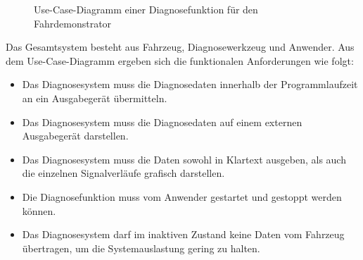 \begin{figure}[!htb]
	\centering
	\caption{Use-Case-Diagramm einer Diagnosefunktion für den Fahrdemonstrator}
	\label{abb:UseCaseDiagnose}
\end{figure}
	
Das Gesamtsystem besteht aus Fahrzeug, Diagnosewerkzeug und Anwender. Aus dem Use-Case-Diagramm ergeben sich die funktionalen Anforderungen wie folgt:

\begin{itemize}
	\item Das Diagnosesystem muss die Diagnosedaten innerhalb der Programmlaufzeit an ein Ausgabegerät übermitteln.
	\item Das Diagnosesystem muss die Diagnosedaten auf einem externen Ausgabegerät darstellen.
	\item Das Diagnosesystem muss die Daten sowohl in Klartext ausgeben, als auch die einzelnen Signalverläufe grafisch darstellen. 
	\item Die Diagnosefunktion muss vom Anwender gestartet und gestoppt werden können.
	\item Das Diagnosesystem darf im inaktiven Zustand keine Daten vom Fahrzeug übertragen, um die Systemauslastung gering zu halten.\\
\end{itemize}


